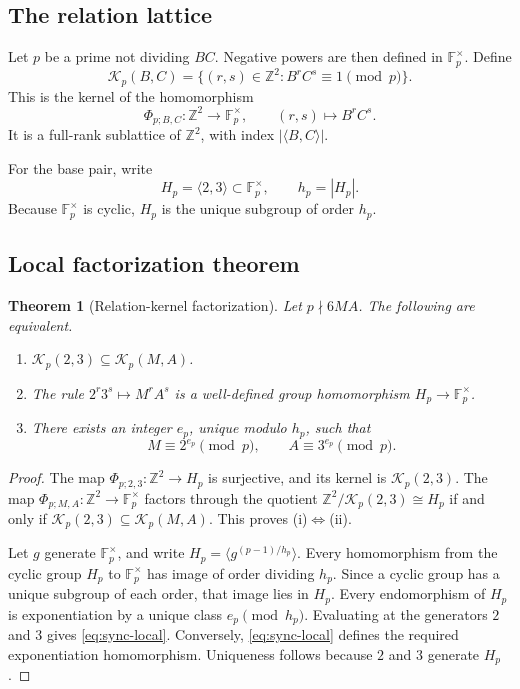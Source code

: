 \documentclass[11pt]{article}
\newtheorem{theorem}{Theorem}[section]
\theoremstyle{definition}
\newcommand{\Z}{\mathbb Z}
\newcommand{\F}{\mathbb F}
\newcommand{\Rel}{\mathcal K}
\begin{document}
\subsection{The relation lattice}

Let $p$ be a prime not dividing $BC$.  Negative powers are then defined in
$\F_p^\times$.  Define
\begin{equation}
 \Rel_p(B,C)
 =\{(r,s)\in\Z^2:B^rC^s\equiv1\pmod p\}.
 \label{eq:relation-kernel}
\end{equation}
This is the kernel of the homomorphism
\[
 \Phi_{p;B,C}:\Z^2\longrightarrow\F_p^\times,
 \qquad(r,s)\longmapsto B^rC^s.
\]
It is a full-rank sublattice of $\Z^2$, with index
$|\langle B,C\rangle|$.

For the base pair, write
\[
 H_p=\langle2,3\rangle\subset\F_p^\times,
 \qquad h_p=|H_p|.
\]
Because $\F_p^\times$ is cyclic, $H_p$ is the unique subgroup of order $h_p$.

\subsection{Local factorization theorem}

\begin{theorem}[Relation-kernel factorization]
\label{thm:local-sync}
Let $p\nmid6MA$.  The following are equivalent.
\begin{enumerate}[label=(\roman*)]
\item $\Rel_p(2,3)\subseteq\Rel_p(M,A)$.
\item The rule $2^r3^s\mapsto M^rA^s$ is a well-defined group homomorphism
$H_p\to\F_p^\times$.
\item There exists an integer $e_p$, unique modulo $h_p$, such that
\begin{equation}
 M\equiv2^{e_p}\pmod p,
 \qquad
 A\equiv3^{e_p}\pmod p.
 \label{eq:sync-local}
\end{equation}
\end{enumerate}
\end{theorem}

\begin{proof}
The map $\Phi_{p;2,3}:\Z^2\to H_p$ is surjective, and its kernel is
$\Rel_p(2,3)$.  The map $\Phi_{p;M,A}:\Z^2\to\F_p^\times$ factors through the quotient
$\Z^2/\Rel_p(2,3)\cong H_p$ if and only if
$\Rel_p(2,3)\subseteq\Rel_p(M,A)$.  This proves (i)$\Leftrightarrow$(ii).

Let $g$ generate $\F_p^\times$, and write $H_p=\langle g^{(p-1)/h_p}\rangle$.  Every
homomorphism from the cyclic group $H_p$ to $\F_p^\times$ has image of order dividing
$h_p$.  Since a cyclic group has a unique subgroup of each order, that image lies in $H_p$.
Every endomorphism of $H_p$ is exponentiation by a unique class $e_p\pmod{h_p}$.  Evaluating
at the generators $2$ and $3$ gives \eqref{eq:sync-local}.  Conversely,
\eqref{eq:sync-local} defines the required exponentiation homomorphism.  Uniqueness follows
because $2$ and $3$ generate $H_p$.
\end{proof}
\end{document}

